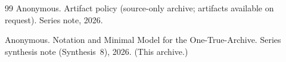 \documentclass[11pt]{article}
\theoremstyle{definition}
\theoremstyle{remark}
\begin{document}
\begin{thebibliography}{99}
Anonymous.
\newblock Artifact policy (source-only archive; artifacts available on request).
\newblock Series note, 2026.


Anonymous.
\newblock Notation and Minimal Model for the One-True-Archive.
\newblock Series synthesis note (Synthesis~8), 2026. (This archive.)


\end{thebibliography}
\end{document}

